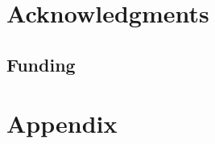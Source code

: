 \documentclass[11pt]{article}
\begin{document}
\section{Acknowledgments}\label{sec:acknowledgments}


\subsection{Funding}\label{sec:funding}


\newpage
\section{Appendix}





 

 



\newpage
\hypertarget{references}{%
\label{references}}
\renewcommand{\bibname}{References}



\end{document}
